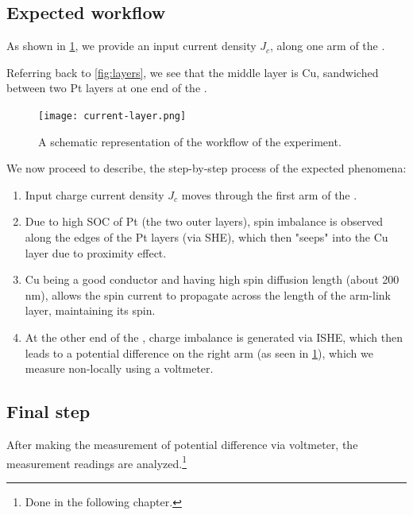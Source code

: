 \subsection{Expected workflow}

As shown in \cref{fig:layer-workflow}, we provide an input current density \( J_c \), along one arm of the \Hst.

Referring back to \cref{fig:layers}, we see that the middle layer is Cu, sandwiched between two Pt layers at one end of the \Hst.

\begin{figure}[h!]
    \centering
    \texttt{[image: current-layer.png]}
    \caption{A schematic representation of the workflow of the experiment.}
    \label{fig:layer-workflow}
\end{figure}

We now proceed to describe, the step-by-step process of the expected phenomena:

\begin{enumerate}
    \item Input charge current density \( J_c \) moves through the first arm of the \Hst.
    \item Due to high SOC of Pt (the two outer layers), spin imbalance is observed along the edges of the Pt layers (via SHE), which then "seeps" into the Cu layer due to proximity effect. %
    \item Cu being a good conductor and having high spin diffusion length (about 200 nm), allows the spin current to propagate across the length of the arm-link layer, maintaining its spin.
    \item At the other end of the \Hst, charge imbalance is generated via ISHE, which then leads to a potential difference on the right arm (as seen in \cref{fig:layer-workflow}), which we measure non-locally using a voltmeter.
\end{enumerate}


\subsection{Final step}

After making the measurement of potential difference via voltmeter, the measurement readings are analyzed.\footnote{Done in the following chapter.}
